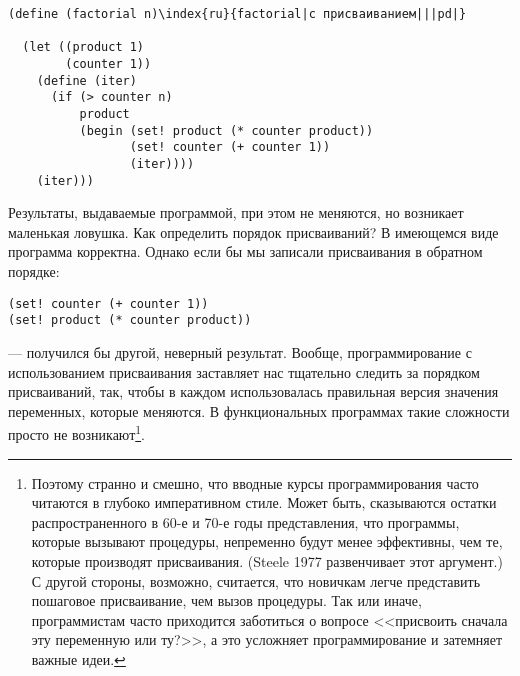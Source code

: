 \begin{Verbatim}[fontsize=\small]
(define (factorial n)\index{ru}{factorial|с присваиванием|||pd|}

  (let ((product 1)
        (counter 1))
    (define (iter)
      (if (> counter n)
          product
          (begin (set! product (* counter product))
                 (set! counter (+ counter 1))
                 (iter))))
    (iter)))
\end{Verbatim}
Результаты, выдаваемые программой, при этом не меняются, но возникает
маленькая ловушка.  Как определить порядок присваиваний?  В имеющемся виде
программа корректна.  Однако если бы мы записали присваивания в
обратном порядке:

\begin{Verbatim}[fontsize=\small]
(set! counter (+ counter 1))
(set! product (* counter product))
\end{Verbatim}
--- получился бы другой, неверный результат.  Вообще, программирование с
использованием присваивания заставляет нас тщательно следить за
порядком присваиваний, так, чтобы в каждом использовалась правильная
версия значения переменных, которые меняются.  В функциональных
программах такие сложности просто не возникают\footnote{Поэтому
  странно и смешно, что вводные курсы
  программирования часто читаются в глубоко императивном стиле.  Может
  быть, сказываются остатки распространенного в 60-е и 70-е
  годы представления, что программы, которые вызывают процедуры, непременно будут
  менее эффективны, чем те, которые производят присваивания.
  (Steele 1977 развенчивает этот аргумент.)
  С другой стороны, возможно, считается, что новичкам легче представить
  пошаговое присваивание, чем вызов процедуры.  Так или иначе,
  программистам часто приходится заботиться о вопросе
  <<присвоить сначала эту переменную или ту?>>, а это усложняет
  программирование и затемняет важные идеи.}.

